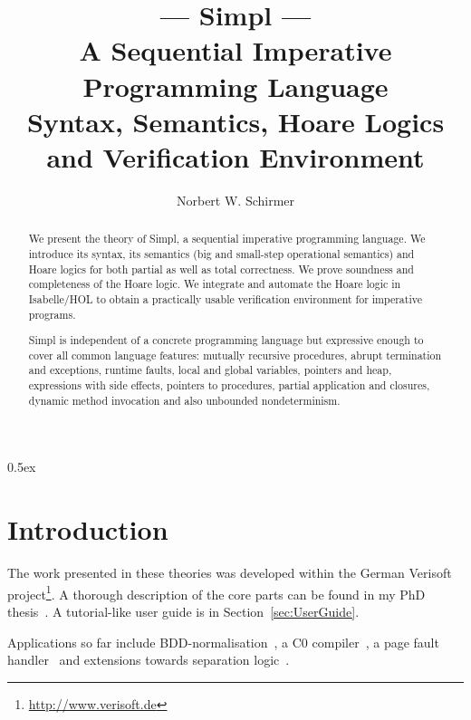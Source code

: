 \documentclass[11pt,a4paper]{article}
\begin{document}
\title{--- \textbf{Simpl} --- \\
       A Sequential Imperative Programming Language\\  
       Syntax, Semantics, Hoare Logics and Verification Environment}
\author{Norbert W. Schirmer}

\begin{abstract}
We present the theory of Simpl, a sequential imperative programming language.
We introduce its syntax, its semantics (big and small-step operational
semantics) and Hoare logics for both partial as well as total correctness. 
We prove soundness and completeness of the Hoare logic. We
integrate and automate the Hoare logic in Isabelle/HOL to obtain a
practically usable verification environment for imperative programs.

Simpl is independent of a concrete programming language but expressive
enough to cover all common language features: mutually recursive
procedures, abrupt termination and exceptions, runtime faults, local
and global variables, pointers and heap, expressions with side
effects, pointers to procedures, partial application and closures,
dynamic method invocation and also unbounded nondeterminism.  
\end{abstract}

\maketitle

\tableofcontents
\parindent 0pt\parskip 0.5ex

\pagebreak

\begin{center}
  \end{center}

\pagebreak

\section{Introduction}

The work presented in these theories was developed within the German Verisoft 
project\footnote{\url{http://www.verisoft.de}}. A thorough description of the core
parts can be found in my PhD thesis~\cite{Schirmer-PhD}. A tutorial-like user guide
is in Section~\ref{sec:UserGuide}.

Applications so far include BDD-normalisation~\cite{Ortner-Schirmer-TPHOL05},
a C0 compiler~\cite{Leinenbach:SSV08-??}, a page fault handler~\cite{Alkassar:TACAS08-??}
and extensions towards separation logic~\cite{Tuch:separation-logic:2007}.






\end{document}
